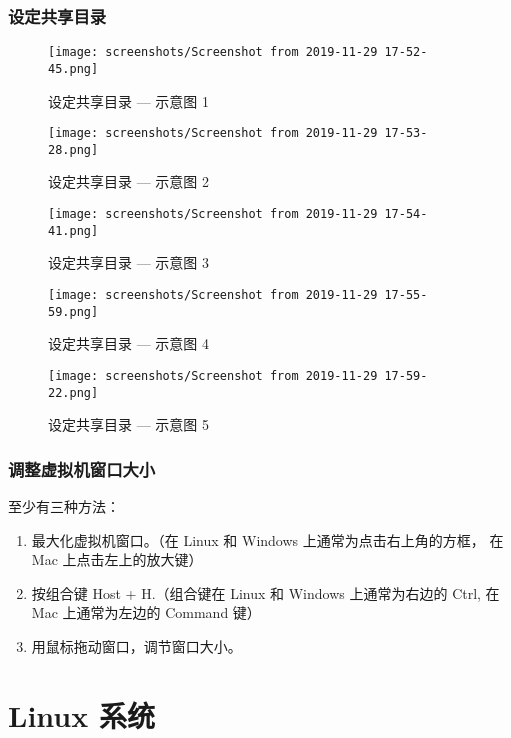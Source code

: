 \documentclass[cn,11pt, simple]{elegantbook}
\begin{document}
\subsubsection{设定共享目录}%
\label{ssub:virtualbox-tip-share-folder}
\begin{figure}[!htbp]
  \centering
  \texttt{[image: screenshots/Screenshot from
  2019-11-29 17-52-45.png]}
  \caption{设定共享目录 --- 示意图 1}
\end{figure}
\begin{figure}[!htbp]
  \centering
  \texttt{[image: screenshots/Screenshot from
  2019-11-29 17-53-28.png]}
  \caption{设定共享目录 --- 示意图 2}
\end{figure}
\begin{figure}[!htbp]
  \centering
  \texttt{[image: screenshots/Screenshot from
  2019-11-29 17-54-41.png]}
  \caption{设定共享目录 --- 示意图 3}
\end{figure}
\begin{figure}[!htbp]
  \centering
  \texttt{[image: screenshots/Screenshot from
  2019-11-29 17-55-59.png]}
  \caption{设定共享目录 --- 示意图 4}
\end{figure}
\begin{figure}[!htbp]
  \centering
  \texttt{[image: screenshots/Screenshot from
  2019-11-29 17-59-22.png]}
  \caption{设定共享目录 --- 示意图 5}
\end{figure}

\subsubsection{调整虚拟机窗口大小}%
\label{ssub:virtualbox-tip-window-size}

至少有三种方法：
\begin{enumerate}
    \item 最大化虚拟机窗口。（在 Linux 和 Windows 上通常为点击右上角的方框，
        在 Mac 上点击左上的放大键）
    \item 按组合键 Host + H.（组合键在 Linux 和 Windows 上通常为右边的
        Ctrl, 在 Mac 上通常为左边的 Command 键）
    \item 用鼠标拖动窗口，调节窗口大小。
\end{enumerate}

\section{Linux 系统}%
\label{sec:linux-tips}
\end{document}
